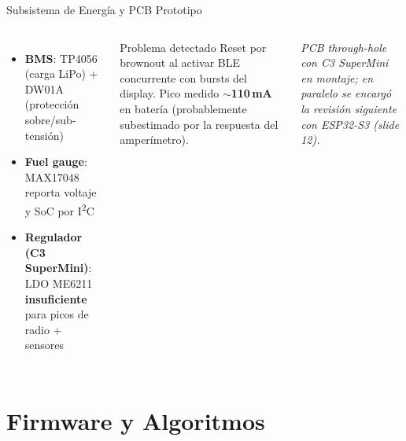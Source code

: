 \documentclass[aspectratio=169, 10pt]{beamer}
\begin{document}
\begin{frame}{Subsistema de Energ\'ia y PCB Prototipo}
    \begin{columns}[T]
        \begin{itemize}
            \item \textbf{BMS}: TP4056 (carga LiPo) + DW01A (protecci\'on sobre/sub-tensi\'on)
            \item \textbf{Fuel gauge}: MAX17048 reporta voltaje y SoC por I\textsuperscript{2}C
            \item \textbf{Regulador (C3 SuperMini)}: LDO ME6211 \alert{\textbf{insuficiente}} para picos de radio + sensores
        \end{itemize}
        \vspace{0.2cm}
        \begin{alertblock}{Problema detectado}
            \scriptsize Reset por brownout al activar BLE concurrente con bursts del display. Pico medido $\sim$\textbf{110\,mA} en bater\'ia (probablemente subestimado por la respuesta del amper\'imetro).
        \end{alertblock}
        \vspace{0.2cm}
        \scriptsize \textit{PCB through-hole con C3 SuperMini en montaje; en paralelo se encarg\'o la revisi\'on siguiente con ESP32-S3 (slide 12).}
    \end{columns}
\end{frame}

\section{Firmware y Algoritmos}
\end{document}
